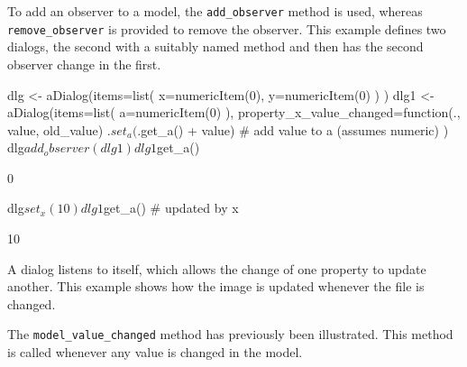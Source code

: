 \documentclass{article}
\newcommand{\code}[1]{\texttt{#1}} %
\newcommand{\generic}[1]{\code{#1}} %
\newcommand{\meth}[1]{\generic{#1}}     %
\begin{document}
To add an observer to a model, the \meth{add\_observer} method is
used, whereas \meth{remove\_observer} is provided to remove the observer.
This example defines two dialogs, the second with a suitably named
method and then has the second observer change in the first.
\begin{Schunk}
\begin{Sinput}
 dlg <- aDialog(items=list(
                  x=numericItem(0),
                  y=numericItem(0)
                  )
                )
 dlg1 <- aDialog(items=list(
                   a=numericItem(0)
                   ),
                 property_x_value_changed=function(., value, old_value) {
                   .$set_a(.$get_a() + value) # add value to a (assumes numeric)
                 }
                 )
 dlg$add_observer(dlg1)
 dlg1$get_a()
\end{Sinput}
\begin{Soutput}
[1] 0
\end{Soutput}
\begin{Sinput}
 dlg$set_x(10)
 dlg1$get_a()                            # updated by x
\end{Sinput}
\begin{Soutput}
[1] 10
\end{Soutput}
\end{Schunk}

A dialog listens to itself, which allows the change of one property
to update another. This example shows how the image is updated whenever
the file is changed.

\begin{Schunk}
\end{Schunk}

The \meth{model\_value\_changed} method has previously been
illustrated. This method is called whenever any value is changed in
the model.
\end{document}
